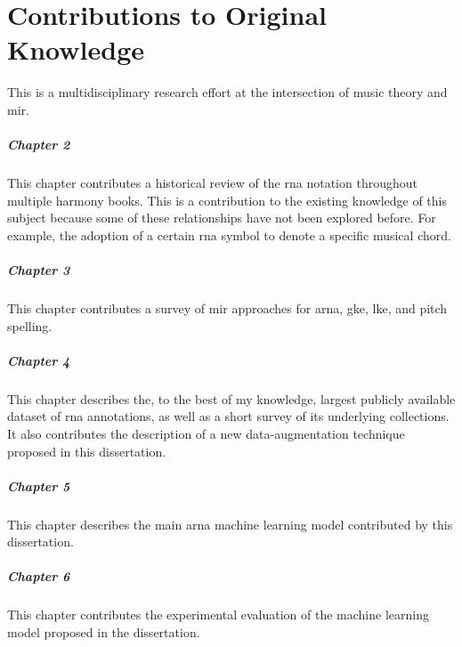 \chapter*{Contributions to Original Knowledge}
\label{chap:contributionstoknowledge}

This \thesisdiss{} is a multidisciplinary research effort at
the intersection of music theory and \gls{mir}.

\paragraph{Chapter 2}

This chapter contributes a historical review of the
\gls{rna} notation throughout multiple harmony books. This
is a contribution to the existing knowledge of this subject
because some of these relationships have not been explored
before. For example, the adoption of a certain \gls{rna}
symbol to denote a specific musical chord.

\paragraph{Chapter 3}

This chapter contributes a survey of \gls{mir} approaches
for \gls{arna}, \gls{gke}, \gls{lke}, and pitch spelling. 

\paragraph{Chapter 4}

This chapter describes the, to the best of my knowledge,
largest publicly available dataset of \gls{rna} annotations,
as well as a short survey of its underlying collections. It
also contributes the description of a new data-augmentation
technique proposed in this dissertation.

\paragraph{Chapter 5}

This chapter describes the main \gls{arna} machine learning
model contributed by this dissertation.

\paragraph{Chapter 6}

This chapter contributes the experimental evaluation of the
machine learning model proposed in the dissertation. 
